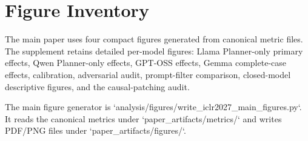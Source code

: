 \section{Figure Inventory}
The main paper uses four compact figures generated from canonical metric files. The supplement retains detailed per-model figures: Llama Planner-only primary effects, Qwen Planner-only effects, GPT-OSS effects, Gemma complete-case effects, calibration, adversarial audit, prompt-filter comparison, closed-model descriptive figures, and the causal-patching audit.

The main figure generator is `analysis/figures/write_iclr2027_main_figures.py`. It reads the canonical metrics under `paper_artifacts/metrics/` and writes PDF/PNG files under `paper_artifacts/figures/`.
